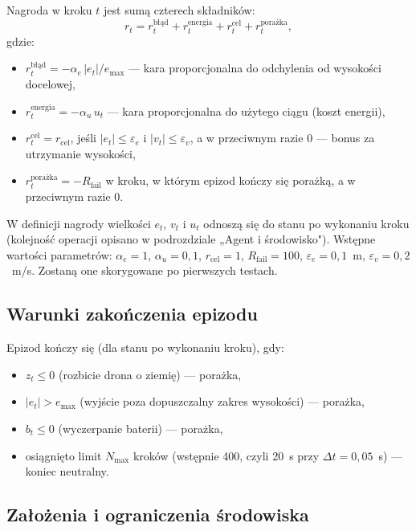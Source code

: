 \documentclass[12pt]{article}
\begin{document}
Nagroda w kroku $t$ jest sumą czterech składników:
\begin{equation}
    r_t = r_t^{\text{błąd}} + r_t^{\text{energia}} + r_t^{\text{cel}} + r_t^{\text{porażka}},
\end{equation}
gdzie:
\begin{itemize}
    \item $r_t^{\text{błąd}} = -\alpha_e\,|e_t| / e_{\max}$ --- kara proporcjonalna do odchylenia od wysokości docelowej,
    \item $r_t^{\text{energia}} = -\alpha_u\,u_t$ --- kara proporcjonalna do użytego ciągu (koszt energii),
    \item $r_t^{\text{cel}} = r_{\mathrm{cel}}$, jeśli $|e_t| \le \varepsilon_e$ i $|v_t| \le \varepsilon_v$, a w przeciwnym razie $0$ --- bonus za utrzymanie wysokości,
    \item $r_t^{\text{porażka}} = -R_{\mathrm{fail}}$ w kroku, w którym epizod kończy się porażką, a w przeciwnym razie $0$.
\end{itemize}
W definicji nagrody wielkości $e_t$, $v_t$ i $u_t$ odnoszą się do stanu po wykonaniu kroku (kolejność operacji opisano w podrozdziale „Agent i środowisko"). Wstępne wartości parametrów: $\alpha_e = 1$, $\alpha_u = 0{,}1$, $r_{\mathrm{cel}} = 1$, $R_{\mathrm{fail}} = 100$, $\varepsilon_e = 0{,}1$~m, $\varepsilon_v = 0{,}2$~m/s. Zostaną one skorygowane po pierwszych testach.

\subsection{Warunki zakończenia epizodu}

Epizod kończy się (dla stanu po wykonaniu kroku), gdy:
\begin{itemize}
    \item $z_t \le 0$ (rozbicie drona o ziemię) --- porażka,
    \item $|e_t| > e_{\max}$ (wyjście poza dopuszczalny zakres wysokości) --- porażka,
    \item $b_t \le 0$ (wyczerpanie baterii) --- porażka,
    \item osiągnięto limit $N_{\max}$ kroków (wstępnie 400, czyli 20~s przy $\Delta t = 0{,}05$~s) --- koniec neutralny.
\end{itemize}

\subsection{Założenia i ograniczenia środowiska}
\end{document}
